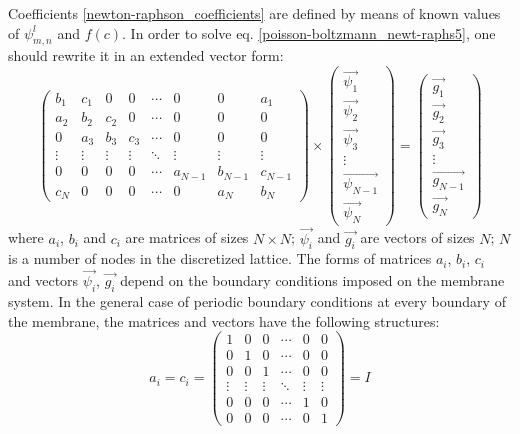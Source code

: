 Coefficients \eqref{newton-raphson_coefficients} are defined by means of known values of $\psi^l_{m,n}$ and $f(c)$. In order to solve eq. \eqref{poisson-boltzmann_newt-raphs5}, one should rewrite it in an extended vector form:
\begin{equation}
  \label{matrix}\begin{pmatrix}
  b_1 & c_1 & 0 & 0 & \cdots & 0 & 0 & a_1 \\
  a_2 & b_2 & c_2 & 0 & \cdots & 0 & 0 & 0 \\
  0 & a_3 & b_3 & c_3 & \cdots & 0 & 0 & 0 \\
  \vdots  & \vdots & \vdots & \vdots  & \ddots & \vdots & \vdots & \vdots  \\
  0 & 0 & 0 & 0 & \cdots& a_{N-1} & b_{N-1} & c_{N-1} \\
  c_N & 0 & 0 & 0 & \cdots & 0 & a_N & b_N
 \end{pmatrix}\times
\begin{pmatrix}
  \vec{\psi_1} \\
  \vec{\psi_2} \\
  \vec{\psi_3} \\
  \vdots \\
  \vec{\psi_{N-1}} \\
  \vec{\psi_N}
 \end{pmatrix} = 
\begin{pmatrix}
  \vec{g_1} \\
  \vec{g_2} \\
  \vec{g_3} \\
  \vdots \\
  \vec{g_{N-1}} \\
  \vec{g_{N}}
 \end{pmatrix}
\end{equation}
where $a_i$, $b_i$ and $c_i$ are matrices of sizes $N\times N$; $\vec{\psi_i}$ and $\vec{g_i}$ are vectors of sizes $N$; $N$ is a number of nodes in the discretized lattice. The forms of matrices $a_i$, $b_i$, $c_i$ and vectors $\vec{\psi_i}$, $\vec{g_i}$ depend on the boundary conditions imposed on the membrane system. In the general case of periodic boundary conditions at every boundary of the membrane, the matrices and vectors have the following structures:
\begin{equation}
 a_i=c_i=
 \begin{pmatrix}
  1 & 0 & 0 & \cdots & 0 & 0 \\
  0 & 1 & 0 & \cdots & 0 & 0 \\
  0 & 0 & 1 & \cdots & 0 & 0 \\
  \vdots  & \vdots & \vdots  & \ddots &  \vdots & \vdots  \\
  0 & 0 & 0 & \cdots & 1 & 0 \\
  0 & 0 & 0 & \cdots & 0 & 1
 \end{pmatrix} = I
\end{equation}
